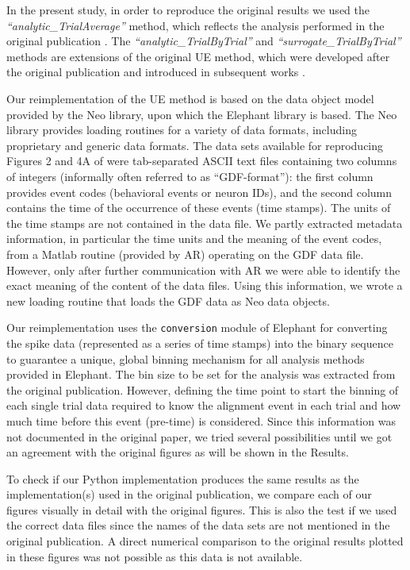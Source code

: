 \documentclass[10pt,a4paper,onecolumn]{article}
\begin{document}
In the present study, in order to reproduce the original results we used
the \emph{``analytic\_TrialAverage''} method, which reflects the
analysis performed in the original publication \autocite{Riehle97}. The
\emph{``analytic\_TrialByTrial''} and \emph{``surrogate\_TrialByTrial''}
methods are extensions of the original UE method, which were developed
after the original publication and introduced in subsequent works
\autocites{Gruen03b}{Gruen09}.

Our reimplementation of the UE method is based on the data object model
provided by the Neo library, upon which the Elephant library is based.
The Neo library provides loading routines for a variety of data formats,
including proprietary and generic data formats. The data sets available
for reproducing Figures 2 and 4A of \autocite{Riehle97} were
tab-separated ASCII text files containing two columns of integers
(informally often referred to as ``GDF-format''): the first column
provides event codes (behavioral events or neuron IDs), and the second
column contains the time of the occurrence of these events (time
stamps). The units of the time stamps are not contained in the data
file. We partly extracted metadata information, in particular the time
units and the meaning of the event codes, from a Matlab routine
(provided by AR) operating on the GDF data file. However, only after
further communication with AR we were able to identify the exact meaning
of the content of the data files. Using this information, we wrote a new
loading routine that loads the GDF data as Neo data objects.

Our reimplementation uses the \texttt{conversion} module of Elephant for
converting the spike data (represented as a series of time stamps) into
the binary sequence to guarantee a unique, global binning mechanism for
all analysis methods provided in Elephant. The bin size to be set for
the analysis was extracted from the original publication. However,
defining the time point to start the binning of each single trial data
required to know the alignment event in each trial and how much time
before this event (pre-time) is considered. Since this information was
not documented in the original paper, we tried several possibilities
until we got an agreement with the original figures as will be shown in
the Results.

To check if our Python implementation produces the same results as the
implementation(s) used in the original publication, we compare each of
our figures visually in detail with the original figures. This is also
the test if we used the correct data files since the names of the data
sets are not mentioned in the original publication. A direct numerical
comparison to the original results plotted in these figures was not
possible as this data is not available.
\end{document}
